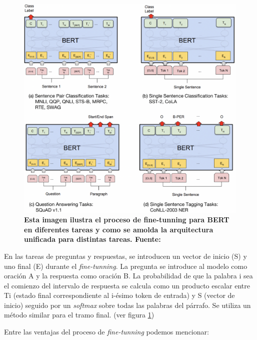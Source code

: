 \begin{figure}[ht!]
    \centering
    \includegraphics[scale=0.6]{figuras/intro-bert-finetunning.png}
    \caption[BERT - Fine-tunning]{\textbf{Esta imagen ilustra el proceso de fine-tunning para BERT en diferentes tareas y como se amolda la arquitectura unificada para distintas tareas. Fuente: \cite{https://doi.org/10.48550/arxiv.1706.03762}}}
    \label{fig-intro-bert-finetunning}
\end{figure}

En las tareas de preguntas y respuestas, se introducen un vector de inicio (S) y uno final (E) durante el \textit{fine-tunning}. La pregunta se introduce al modelo como oración A y la respuesta como oración B. La probabilidad de que la palabra i sea el comienzo del intervalo de respuesta se calcula como un producto escalar entre Ti (estado final correspondiente al i-ésimo token de entrada) y S (vector de inicio) seguido por un \textit{softmax} sobre todas las palabras del párrafo. Se utiliza un método similar para el tramo final. (ver figura \ref{fig-intro-bert-finetunning})

Entre las ventajas del proceso de \textit{fine-tunning} podemos mencionar:

